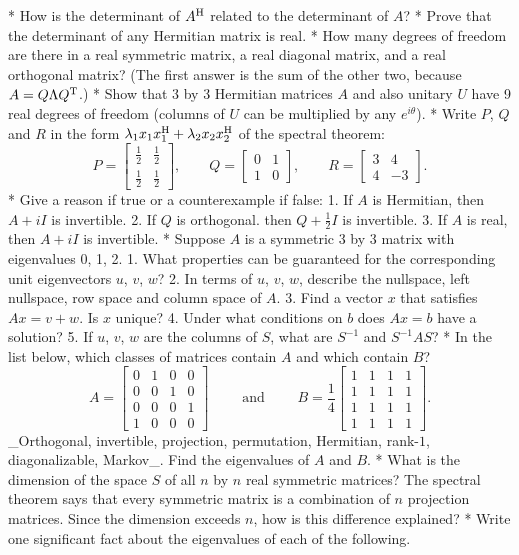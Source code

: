 * How is the determinant of \(A^{\rm H}\) related to the determinant of \(A\)?
* Prove that the determinant of any Hermitian matrix is real.
* How many degrees of freedom are there in a real symmetric matrix, a real diagonal matrix, and a real orthogonal matrix? (The first answer is the sum of the other two, because \(A=Q\Lambda Q^{\rm T}\).)
* Show that 3 by 3 Hermitian matrices \(A\) and also unitary \(U\) have 9 real degrees of freedom (columns of \(U\) can be multiplied by any \(e^{i\theta}\)).
* Write \(P\), \(Q\) and \(R\) in the form \(\lambda_{1}x_{1}x_{1}^{\rm H}+\lambda_{2}x_{2}x_{2}^{\rm H}\) of the spectral theorem: \[P=\begin{bmatrix}\frac{1}{2}&\frac{1}{2}\\ \frac{1}{2}&\frac{1}{2}\end{bmatrix},\qquad Q=\begin{bmatrix}0&1\\ 1&0\end{bmatrix},\qquad R=\begin{bmatrix}3&4\\ 4&-3\end{bmatrix}.\]
* Give a reason if true or a counterexample if false: 1. If \(A\) is Hermitian, then \(A+iI\) is invertible. 2. If \(Q\) is orthogonal. then \(Q+\frac{1}{2}I\) is invertible. 3. If \(A\) is real, then \(A+iI\) is invertible.
* Suppose \(A\) is a symmetric 3 by 3 matrix with eigenvalues 0, 1, 2. 1. What properties can be guaranteed for the corresponding unit eigenvectors \(u\), \(v\), \(w\)? 2. In terms of \(u\), \(v\), \(w\), describe the nullspace, left nullspace, row space and column space of \(A\). 3. Find a vector \(x\) that satisfies \(Ax=v+w\). Is \(x\) unique? 4. Under what conditions on \(b\) does \(Ax=b\) have a solution? 5. If \(u\), \(v\), \(w\) are the columns of \(S\), what are \(S^{-1}\) and \(S^{-1}AS\)?
* In the list below, which classes of matrices contain \(A\) and which contain \(B\)? \[A=\begin{bmatrix}0&1&0&0\\ 0&0&1&0\\ 0&0&0&1\\ 1&0&0&0\end{bmatrix}\qquad\text{ and }\qquad B=\frac{1}{4}\begin{bmatrix}1&1&1&1 \\ 1&1&1&1\\ 1&1&1&1\\ 1&1&1&1\end{bmatrix}.\] _Orthogonal, invertible, projection, permutation, Hermitian, rank-\(1\), diagonalizable, Markov_. Find the eigenvalues of \(A\) and \(B\).
* What is the dimension of the space \(S\) of all \(n\) by \(n\) real symmetric matrices? The spectral theorem says that every symmetric matrix is a combination of \(n\) projection matrices. Since the dimension exceeds \(n\), how is this difference explained?
* Write one significant fact about the eigenvalues of each of the following.

 